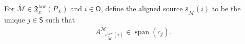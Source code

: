 For \(\widetilde{\mathcal M}\in\mathfrak F_x^{\mathrm{law}}(P_X)\) and \(i\in\mathsf O\), define the aligned source \(\bar s_{\widetilde{\mathcal M}}(i)\) to be the unique \(j\in\mathsf S\) such that
\[
 A^{\widetilde{\mathcal M}}_{:,s_{\widetilde{\mathcal M}}^{\mathrm{law}}(i)}
 \in\operatorname{span}(c_j).
\]